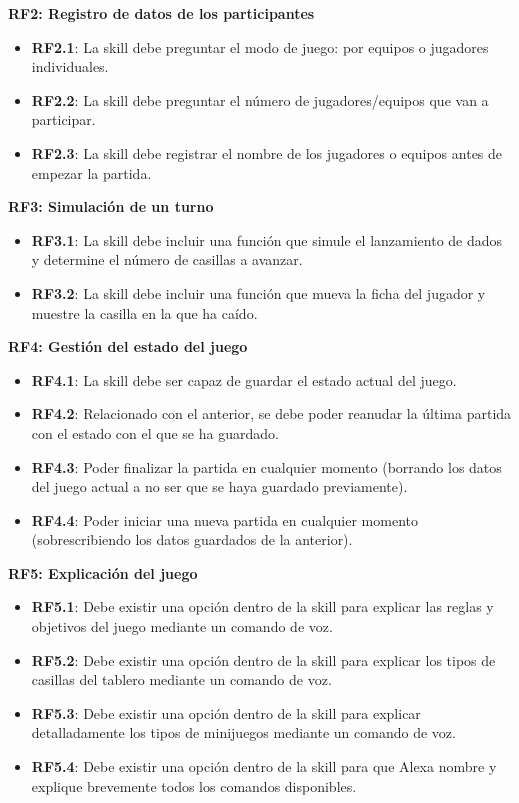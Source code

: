 \textbf{RF2: Registro de datos de los participantes}
\begin{itemize}
	\item \textbf{RF2.1}: La skill debe preguntar el modo de juego: por equipos o jugadores individuales. 
	\item \textbf{RF2.2}: La skill debe preguntar el número de jugadores/equipos que van a participar.
	\item \textbf{RF2.3}: La skill debe registrar el nombre de los jugadores o equipos antes de empezar la partida.
\end{itemize}

\textbf{RF3: Simulación de un turno}
\begin{itemize}
    \item \textbf{RF3.1}: La skill debe incluir una función que simule el lanzamiento de dados y determine el número de casillas a avanzar.
    \item \textbf{RF3.2}: La skill debe incluir una función que mueva la ficha del jugador y muestre la casilla en la que ha caído.
\end{itemize}

\textbf{RF4: Gestión del estado del juego}
\begin{itemize}
    \item \textbf{RF4.1}: La skill debe ser capaz de guardar el estado actual del juego.
    \item \textbf{RF4.2}: Relacionado con el anterior, se debe poder reanudar la última partida con el estado con el que se ha guardado.
    \item \textbf{RF4.3}: Poder finalizar la partida en cualquier momento (borrando los datos del juego actual a no ser que se haya guardado previamente).
    \item \textbf{RF4.4}: Poder iniciar una nueva partida en cualquier momento (sobrescribiendo los datos guardados de la anterior).
\end{itemize}

\textbf{RF5: Explicación del juego}
\begin{itemize}
    \item \textbf{RF5.1}: Debe existir una opción dentro de la skill para explicar las reglas y objetivos del juego mediante un comando de voz.
    \item \textbf{RF5.2}: Debe existir una opción dentro de la skill para explicar los tipos de casillas del tablero mediante un comando de voz.
    \item \textbf{RF5.3}: Debe existir una opción dentro de la skill para explicar detalladamente los tipos de minijuegos mediante un comando de voz.
    \item \textbf{RF5.4}: Debe existir una opción dentro de la skill para que Alexa nombre y explique brevemente todos los comandos disponibles.
\end{itemize}

